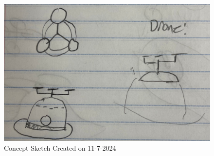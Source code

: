 \begin{figure}[h]
    \centering
    \includegraphics[width=\linewidth]{root/Appendix_A/Concept_Design.pdf}
    \caption{Concept Sketch Created on 11-7-2024}
\end{figure}